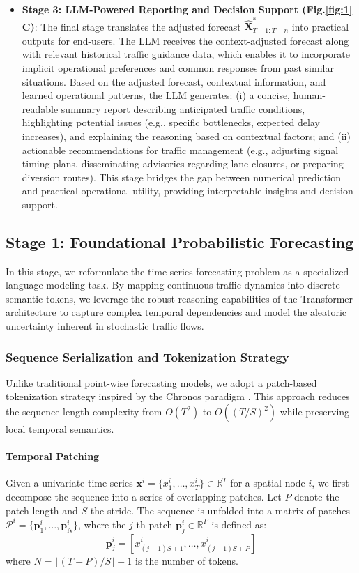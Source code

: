 \documentclass{article}
\begin{document}
\begin{itemize}
    \item \textbf{Stage 3: LLM-Powered Reporting and Decision Support (Fig.\ref{fig:1} C)}: The final stage translates the adjusted forecast $\hat{\mathbf{X}}^*_{T+1:T+n}$ into practical outputs for end-users. The LLM receives the context-adjusted forecast along with relevant historical traffic guidance data, which enables it to incorporate implicit operational preferences and common responses from past similar situations. Based on the adjusted forecast, contextual information, and learned operational patterns, the LLM generates: (i) a concise, human-readable summary report describing anticipated traffic conditions, highlighting potential issues (e.g., specific bottlenecks, expected delay increases), and explaining the reasoning based on contextual factors; and (ii) actionable recommendations for traffic management (e.g., adjusting signal timing plans, disseminating advisories regarding lane closures, or preparing diversion routes). This stage bridges the gap between numerical prediction and practical operational utility, providing interpretable insights and decision support.
\end{itemize}

\subsection{Stage 1: Foundational Probabilistic Forecasting}

In this stage, we reformulate the time-series forecasting problem as a specialized language modeling task. By mapping continuous traffic dynamics into discrete semantic tokens, we leverage the robust reasoning capabilities of the Transformer architecture to capture complex temporal dependencies and model the aleatoric uncertainty inherent in stochastic traffic flows.

\subsubsection{Sequence Serialization and Tokenization Strategy}
Unlike traditional point-wise forecasting models, we adopt a patch-based tokenization strategy inspired by the Chronos paradigm \cite{ansari_chronos_2024}. This approach reduces the sequence length complexity from $O(T^2)$ to $O((T/S)^2)$ while preserving local temporal semantics.

\paragraph{Temporal Patching}
Given a univariate time series $\mathbf{x}^i = \{x^i_1, \dots, x^i_T\} \in \mathbb{R}^T$ for a spatial node $i$, we first decompose the sequence into a series of overlapping patches. Let $P$ denote the patch length and $S$ the stride. The sequence is unfolded into a matrix of patches $\mathcal{P}^i = \{\mathbf{p}^i_1, \dots, \mathbf{p}^i_N\}$, where the $j$-th patch $\mathbf{p}^i_j \in \mathbb{R}^P$ is defined as:
\begin{equation}
    \mathbf{p}^i_j = [x^i_{(j-1)S+1}, \dots, x^i_{(j-1)S+P}]
\end{equation}
where $N = \lfloor (T-P)/S \rfloor + 1$ is the number of tokens.
\end{document}

